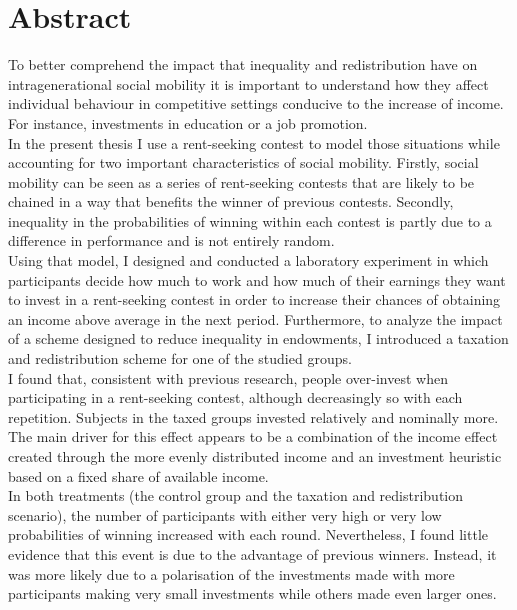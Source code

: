 \chapter*{Abstract}

\begin{small}
To better comprehend the impact that inequality and redistribution have on intragenerational social mobility it is important to understand how they affect individual behaviour in competitive settings conducive to the increase of income. For instance, investments in education or a job promotion.\\

In the present thesis I use a rent-seeking contest to model those situations while accounting for two important characteristics of social mobility. Firstly, social mobility can be seen as a series of rent-seeking contests that are likely to be chained in a way that benefits the winner of previous contests. Secondly, inequality in the probabilities of winning within each contest is partly due to a difference in performance and is not entirely random.\\

Using that model, I designed and conducted a laboratory experiment in which participants decide how much to work and how much of their earnings they want to invest in a rent-seeking contest in order to increase their chances of obtaining an income above average in the next period. Furthermore, to analyze the impact of a scheme designed to reduce inequality in endowments, I introduced a taxation and redistribution scheme for one of the studied groups.\\

I found that, consistent with previous research, people over-invest when participating in a rent-seeking contest, although decreasingly so with each repetition. Subjects in the taxed groups invested relatively and nominally more. The main driver for this effect appears to be a combination of the income effect created through the more evenly distributed income and an investment heuristic based on a fixed share of available income.\\

In both treatments (the control group and the taxation and redistribution scenario), the number of participants with either very high or very low probabilities of winning increased with each round. Nevertheless, I found little evidence that this event is due to the advantage of previous winners. Instead, it was more likely due to a polarisation of the investments made with more participants making very small investments while others made even larger ones.\\


\end{small}

